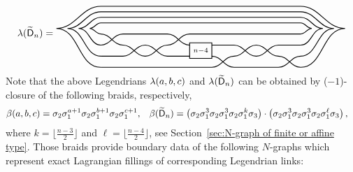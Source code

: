 \begin{align*}
\legendrian({{\exdynD}_n})=
\begin{tikzpicture}[baseline=-0.5ex,scale=0.8]
\draw[thick] (0,0) to[out=0,in=180] (1,-0.5) to[out=0,in=180] (2,-1) to[out=0,in=180] (3,-0.5) to[out=0,in=180] (4,0) to[out=0,in=180] (9,0);
\draw[thick] (0,-0.5) to[out=0,in=180] (1,0) to[out=0,in=180] (3,0) to[out=0,in=180] (4,-0.5) (5,-0.5) to[out=0,in=180] (6,-0.5) to[out=0,in=180] (7,-1) to[out=0,in=180] (8,-0.5) to[out=0,in=180] (9,-0.5);
\draw[thick] (0,-1) to[out=0,in=180] (1,-1) to[out=0,in=180] (2,-0.5) to[out=0,in=180] (3,-1) to[out=0,in=180] (4,-1) (5,-1) to[out=0,in=180] (6,-1.5) to[out=0,in=180] (8,-1.5) to[out=0,in=180] (9,-1);
\draw[thick] (0,-1.5) to[out=0,in=180] (5,-1.5) to[out=0,in=180] (6,-1) to[out=0,in=180] (7,-0.5) to[out=0,in=180] (8,-1) to[out=0,in=180] (9,-1.5);
\draw[thick] (4,-0.4) rectangle node {$\scriptstyle{n-4}$} (5, -1.1);
\draw[thick] (0,0) to[out=180,in=0] (-0.5,0.25) to[out=0,in=180] (0,0.5) to[out=0,in=180] (9,0.5) to[out=0,in=180] (9.5,0.25) to[out=180,in=0] (9,0);
\draw[thick] (0,-0.5) to[out=180,in=0] (-1,0.25) to[out=0,in=180] (0,0.75) to[out=0,in=180] (9,0.75) to[out=0,in=180] (10,0.25) to[out=180,in=0] (9,-0.5);
\draw[thick] (0,-1) to[out=180,in=0] (-1.5,0.25) to[out=0,in=180] (0,1) to[out=0,in=180] (9,1) to[out=0,in=180] (10.5,0.25) to[out=180,in=0] (9,-1);
\draw[thick] (0,-1.5) to[out=180,in=0] (-2,0.25) to[out=0,in=180] (0,1.25) to[out=0,in=180] (9,1.25) to[out=0,in=180] (11,0.25) to[out=180,in=0] (9,-1.5);
\end{tikzpicture}
\end{align*}
Note that the above Legendrians $\lambda(a,b,c)$ and $\lambda(\widetilde{\mathsf{D}}_n)$ can be obtained by ($-1$)-closure of the following braids, respectively,
\begin{align*}
\beta(a,b,c)&=\sigma_2\sigma_1^{a+1}\sigma_2\sigma_1^{b+1}\sigma_2\sigma_1^{c+1},&
\beta(\widetilde{\mathsf{D}}_n)&=\left(\sigma_2\sigma_1^3\sigma_2\sigma_1^3\sigma_2\sigma_1^k\sigma_3\right)\cdot\left(\sigma_2\sigma_1^3\sigma_2\sigma_1^3\sigma_2\sigma_1^\ell\sigma_3\right),
\end{align*}
where $k=\lfloor \frac{n-3}2\rfloor$ and $\ell=\lfloor \frac{n-4}2\rfloor$, see Section~\ref{sec:N-graph of finite or affine type}.
Those braids provide boundary data of the following $N$-graphs which represent exact Lagrangian fillings of corresponding Legendrian links:


